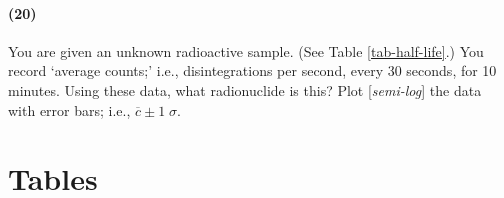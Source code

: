 \documentclass[11pt,a4paper]{article}
\makeatletter
\renewcommand\listoftables{%
    \@starttoc{lot}%
}
\makeatother
\begin{document}
\paragraph*{(20)} 
You are given an unknown radioactive sample. (See Table \ref{tab-half-life}.) You record `average counts;' i.e., disintegrations per second, every 30 seconds, for 10 minutes. Using these data, what radionuclide is this? Plot [\textit{semi-log}] the data with error bars; i.e., $\overline{c} \pm 1 \; \sigma$.
        




\newpage

\section*{Tables}

{%
\let\oldnumberline\numberline%
\renewcommand{\numberline}{\tablename~\oldnumberline}%
\listoftables%
}

\newpage
\end{document}
